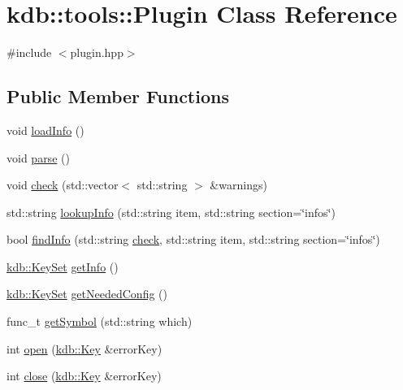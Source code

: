 \hypertarget{classkdb_1_1tools_1_1Plugin}{\section{kdb\-:\-:tools\-:\-:Plugin Class Reference}
\label{classkdb_1_1tools_1_1Plugin}
}


{\ttfamily \#include $<$plugin.\-hpp$>$}

\subsection*{Public Member Functions}
\begin{DoxyCompactItemize}
\item 
void \hyperlink{classkdb_1_1tools_1_1Plugin_a3a0c6a956d1714002ef9baf8c9d99167}{load\-Info} ()
\item 
void \hyperlink{classkdb_1_1tools_1_1Plugin_adfcba2fbdeb436a1083410df804d5fb0}{parse} ()
\item 
void \hyperlink{classkdb_1_1tools_1_1Plugin_a5bb3db65b9d87d18787da8cc65eaca65}{check} (std\-::vector$<$ std\-::string $>$ \&warnings)
\item 
std\-::string \hyperlink{classkdb_1_1tools_1_1Plugin_a5f1dc42adda8340f330eb902812e667d}{lookup\-Info} (std\-::string item, std\-::string section=\char`\"{}infos\char`\"{})
\item 
bool \hyperlink{classkdb_1_1tools_1_1Plugin_a7911f8c46aea6fe4ec6fcb4788b77beb}{find\-Info} (std\-::string \hyperlink{classkdb_1_1tools_1_1Plugin_a5bb3db65b9d87d18787da8cc65eaca65}{check}, std\-::string item, std\-::string section=\char`\"{}infos\char`\"{})
\item 
\hyperlink{classkdb_1_1KeySet}{kdb\-::\-Key\-Set} \hyperlink{classkdb_1_1tools_1_1Plugin_aa4eac3b2b515104a0d595c717c546ec0}{get\-Info} ()
\item 
\hyperlink{classkdb_1_1KeySet}{kdb\-::\-Key\-Set} \hyperlink{classkdb_1_1tools_1_1Plugin_ad2a0a4a64d17c479e7cd8b1402275cc7}{get\-Needed\-Config} ()
\item 
func\-\_\-t \hyperlink{classkdb_1_1tools_1_1Plugin_aca31140802ab463d5bddd95dee73194d}{get\-Symbol} (std\-::string which)
\item 
int \hyperlink{classkdb_1_1tools_1_1Plugin_a680a490123b5290441d76ef2c1e3f1fa}{open} (\hyperlink{classkdb_1_1Key}{kdb\-::\-Key} \&error\-Key)
\item 
int \hyperlink{classkdb_1_1tools_1_1Plugin_a40b5fd413f3f6da735680ed8d7c8a6a2}{close} (\hyperlink{classkdb_1_1Key}{kdb\-::\-Key} \&error\-Key)

\end{DoxyCompactItemize}
